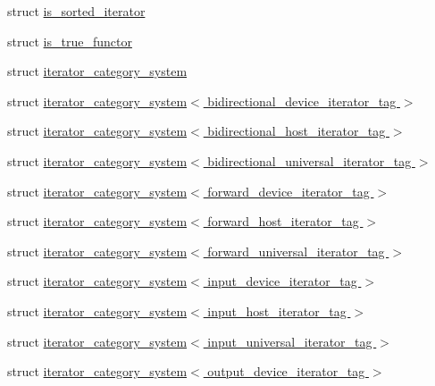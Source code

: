 \begin{DoxyCompactItemize}
\item 
struct \hyperlink{structcugar_1_1is__sorted__iterator}{is\+\_\+sorted\+\_\+iterator}
\item 
struct \hyperlink{structcugar_1_1is__true__functor}{is\+\_\+true\+\_\+functor}
\item 
struct \hyperlink{structcugar_1_1iterator__category__system}{iterator\+\_\+category\+\_\+system}
\item 
struct \hyperlink{structcugar_1_1iterator__category__system_3_01bidirectional__device__iterator__tag_01_4}{iterator\+\_\+category\+\_\+system$<$ bidirectional\+\_\+device\+\_\+iterator\+\_\+tag $>$}
\item 
struct \hyperlink{structcugar_1_1iterator__category__system_3_01bidirectional__host__iterator__tag_01_4}{iterator\+\_\+category\+\_\+system$<$ bidirectional\+\_\+host\+\_\+iterator\+\_\+tag $>$}
\item 
struct \hyperlink{structcugar_1_1iterator__category__system_3_01bidirectional__universal__iterator__tag_01_4}{iterator\+\_\+category\+\_\+system$<$ bidirectional\+\_\+universal\+\_\+iterator\+\_\+tag $>$}
\item 
struct \hyperlink{structcugar_1_1iterator__category__system_3_01forward__device__iterator__tag_01_4}{iterator\+\_\+category\+\_\+system$<$ forward\+\_\+device\+\_\+iterator\+\_\+tag $>$}
\item 
struct \hyperlink{structcugar_1_1iterator__category__system_3_01forward__host__iterator__tag_01_4}{iterator\+\_\+category\+\_\+system$<$ forward\+\_\+host\+\_\+iterator\+\_\+tag $>$}
\item 
struct \hyperlink{structcugar_1_1iterator__category__system_3_01forward__universal__iterator__tag_01_4}{iterator\+\_\+category\+\_\+system$<$ forward\+\_\+universal\+\_\+iterator\+\_\+tag $>$}
\item 
struct \hyperlink{structcugar_1_1iterator__category__system_3_01input__device__iterator__tag_01_4}{iterator\+\_\+category\+\_\+system$<$ input\+\_\+device\+\_\+iterator\+\_\+tag $>$}
\item 
struct \hyperlink{structcugar_1_1iterator__category__system_3_01input__host__iterator__tag_01_4}{iterator\+\_\+category\+\_\+system$<$ input\+\_\+host\+\_\+iterator\+\_\+tag $>$}
\item 
struct \hyperlink{structcugar_1_1iterator__category__system_3_01input__universal__iterator__tag_01_4}{iterator\+\_\+category\+\_\+system$<$ input\+\_\+universal\+\_\+iterator\+\_\+tag $>$}
\item 
struct \hyperlink{structcugar_1_1iterator__category__system_3_01output__device__iterator__tag_01_4}{iterator\+\_\+category\+\_\+system$<$ output\+\_\+device\+\_\+iterator\+\_\+tag $>$}

\end{DoxyCompactItemize}
